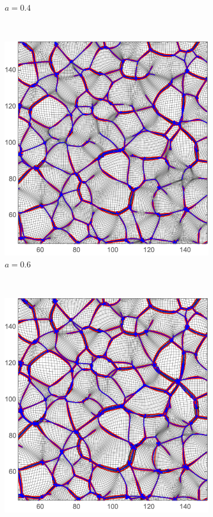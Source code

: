 \documentclass[a4paper, 11pt]{article}
\begin{document}
\begin{figure}
\begin{subfigure}[b]{0.49\textwidth}
\caption{$a=0.4$}
\end{subfigure}\\
\begin{subfigure}[b]{0.49\textwidth}
\includegraphics[width=\textwidth]{Evolution_060}
\caption{$a=0.6$}
\end{subfigure}~
\begin{subfigure}[b]{0.49\textwidth}
\includegraphics[width=\textwidth]{Evolution_080}

\end{subfigure}
\end{figure}
\end{document}
